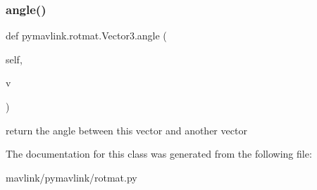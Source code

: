 \subsubsection{\texorpdfstring{angle()}{angle()}}
{\footnotesize\ttfamily def pymavlink.\+rotmat.\+Vector3.\+angle (\begin{DoxyParamCaption}\item[{}]{self,  }\item[{}]{v }\end{DoxyParamCaption})}

\begin{DoxyVerb}return the angle between this vector and another vector\end{DoxyVerb}
 

The documentation for this class was generated from the following file\+:\begin{DoxyCompactItemize}
\item 
mavlink/pymavlink/rotmat.\+py\end{DoxyCompactItemize}
